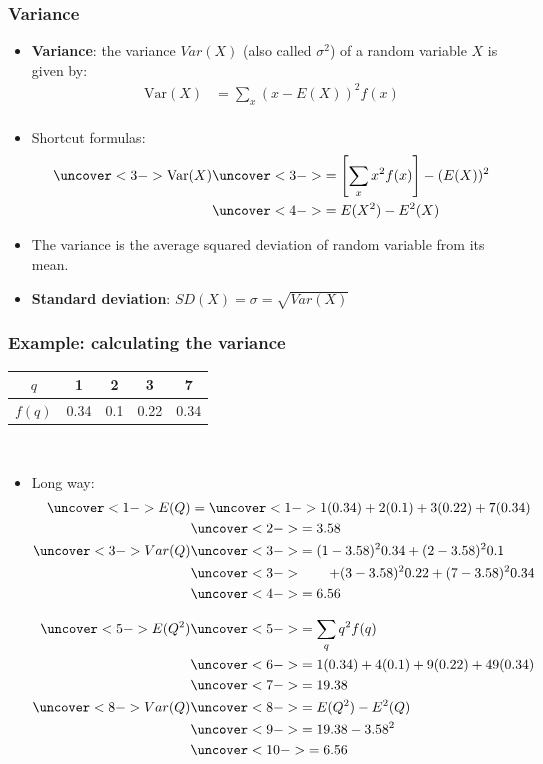 \documentclass[handout]{beamer}\usepackage{graphicx, color}
\providecommand{\q}{$\quad$ \newline}
\numberwithin{equation}{section}
\begin{document}
\begin{frame}
\frametitle{Variance}
\begin{itemize}
\pause \item {\bf Variance}: the variance $Var(X)$ (also called $\sigma^2$) of a random variable $X$ is given by:
\begin{align*}
\text{Var} (X) &= \sum_x (x - E(X))^2 f(x) \\
\end{align*}
\pause \item Shortcut formulas:
\begin{align*}
\uncover<3->{\text{Var} (X) }  & \uncover<3->{= \left [ \sum_x x^2 f(x) \right ]  - (E(X))^2} \\
 & \uncover<4->{= E(X^2) - E^2(X)} \\
\end{align*}
\pause \pause \item The variance is the average squared deviation of random variable from its mean.
\pause \item {\bf Standard deviation}: $SD(X) = \sigma = \sqrt{Var(X)}$
\end{itemize}
\end{frame}

\begin{frame}
\frametitle{Example: calculating the variance} \scriptsize
\begin{tabular}{ccccc}
$q$ & 1 & 2 & 3 & 7  \\ \hline
$f(q)$ & 0.34 & 0.1 & 0.22 & 0.34\\
\end{tabular} \q

\begin{itemize}
\item Long way:
\begin{align*}
\uncover<1->{E(Q)} &= \uncover<1->{ 1 (0.34) + 2(0.1) + 3(0.22) + 7(0.34) }\\
& \uncover<2->{= 3.58} \\
\uncover<3->{Var (Q)} & \uncover<3->{= (1 - 3.58)^2 0.34 + (2-3.58)^2 0.1} \\
& \uncover<3->{\qquad + (3 - 3.58)^2 0.22 + (7-3.58)^2 0.34} \\
& \uncover<4->{= 6.56}
\end{align*}


\begin{align*}
\uncover<5->{E(Q^2)} & \uncover<5->{= \sum_{q} q^2 f(q)} \\
&\uncover<6->{ = 1 (0.34) + 4(0.1) + 9(0.22) + 49(0.34)} \\
& \uncover<7->{= 19.38} \\
\uncover<8->{Var(Q) }& \uncover<8->{= E(Q^2) - E^2(Q)} \\
& \uncover<9->{= 19.38 - 3.58^2} \\
&\uncover<10->{ = 6.56}
\end{align*}
\end{itemize}
\end{frame}
\end{document}

